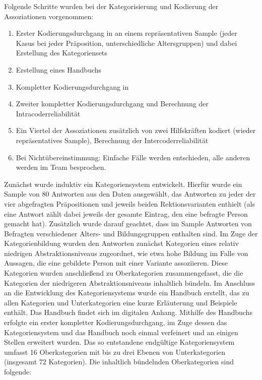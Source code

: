 Folgende Schritte wurden bei der Kategorisierung und Kodierung der Assoziationen vorgenommen: 
\begin{enumerate}
\sloppy
\item Erster Kodierungsdurchgang in \citeauthor{MAXQDA.19892018} an einem repräsentativen Sample  (jeder Kasus bei jeder Präposition, unterschiedliche Altersgruppen) und dabei Erstellung des Kategoriensets
\item Erstellung eines Handbuchs
\item Kompletter Kodierungsdurchgang in \citeauthor{MAXQDA.19892018} 
\item Zweiter kompletter Kodierungsdurchgang und Berechnung der Intracoderreliabilität
\item Ein Viertel der Assoziationen zusätzlich von zwei Hilfskräften kodiert (wieder repräsentatives Sample), Berechnung der Intercoderreliabilität
\item Bei Nichtübereinstimmung: Einfache Fälle werden entschieden, alle anderen werden im Team besprochen. 
\end{enumerate}
Zunächst wurde induktiv ein Kategoriensystem entwickelt. 
Hierfür wurde ein Sample von 80 Antworten aus den Daten ausgewählt, das Antworten zu jeder der vier abgefragten Präpositionen und jeweils beiden Rektionsvarianten enthielt (als eine Antwort zählt dabei jeweils der gesamte Eintrag, den eine befragte Person gemacht hat). 
Zusätzlich wurde darauf geachtet, dass im Sample Antworten von Befragten verschiedener Alters- und Bildungsgruppen enthalten sind. 
Im Zuge der Kategorienbildung wurden den Antworten zunächst Kategorien eines relativ niedrigen {Abstraktions\-niveaus} zugeordnet, wie etwa \glqq hohe Bildung\grqq{} im Falle von Aussagen, die eine gebildete Person mit einer Variante assoziieren. 
Diese Kategorien wurden anschließend zu Oberkategorien zusammengefasst, die die Kategorien der niedrigeren Abstraktionsniveaus inhaltlich bündeln. 
Im Anschluss an die Entwicklung des Kategoriensystems wurde ein Handbuch erstellt, das zu allen Kategorien und Unterkategorien eine kurze Erläuterung und Beispiele enthält. 
Das Handbuch findet sich im digitalen Anhang. 
Mithilfe des Handbuchs erfolgte ein erster kompletter Kodierungsdurchgang, im Zuge dessen das Kategoriensystem und das Handbuch noch einmal verfeinert und an einigen Stellen erweitert wurden. 
Das so entstandene endgültige Kategoriensystem umfasst 16 Oberkategorien mit bis zu drei Ebenen von Unterkategorien (insgesamt 72 Kategorien). 
Die inhaltlich bündelnden Oberkategorien sind folgende: 
